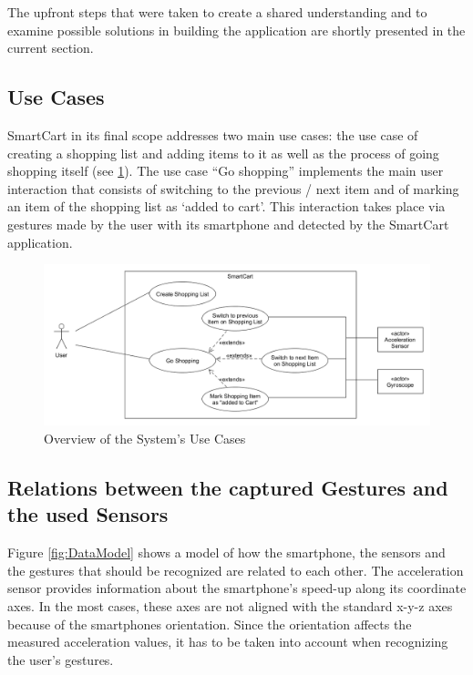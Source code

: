 The upfront steps that were taken to create a shared understanding and to
examine possible solutions in building the application are shortly presented in
the current section.

\subsection{Use Cases}
SmartCart in its final scope addresses two main use cases: the use case of
creating a shopping list and adding items to it as well as the process of going
shopping itself (see \ref{fig:UseCases}). The use case ``Go shopping''
implements the main user interaction that consists of switching to the previous / next item and of
marking an item of the shopping list as `added to cart'. This interaction takes
place via gestures made by the user with its smartphone and detected by the
SmartCart application.

\begin{figure}
\centering
\captionsetup{justification=centering}
\includegraphics[width=\textwidth]{res/sa/useCaseDiagram.png}
\caption{Overview of the System's Use Cases}
\label{fig:UseCases}
\end{figure}

\subsection{Relations between the captured Gestures
and the used Sensors}

\label{sect:dataModel}
Figure \ref{fig:DataModel} shows a model of how the smartphone, the sensors and
the gestures that should be recognized are related to each other. The
acceleration sensor provides information about the smartphone's speed-up along
its coordinate axes. In the most cases, these axes are not aligned with the
standard x-y-z axes because of the smartphones orientation. Since the
orientation affects the measured acceleration values, it has to be taken into
account when recognizing the user's gestures.

